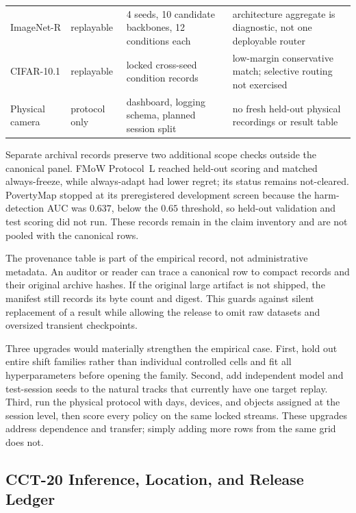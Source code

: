 \begin{table}[!t]
\begin{tabular}{@{}p{}p{}p{}p{}@{}}
ImageNet-R & replayable & 4 seeds, 10 candidate backbones, 12 conditions each & architecture aggregate is diagnostic, not one deployable router \\
CIFAR-10.1 & replayable & locked cross-seed condition records & low-margin conservative match; selective routing not exercised \\
Physical camera & protocol only & dashboard, logging schema, planned session split & no fresh held-out physical recordings or result table \\
\bottomrule
\end{tabular}
\end{table}

Separate archival records preserve two additional scope checks outside the canonical panel. FMoW
Protocol~L reached held-out scoring and matched always-freeze, while always-adapt had lower regret;
its status remains not-cleared. PovertyMap stopped at its preregistered development screen because
the harm-detection AUC was $0.637$, below the $0.65$ threshold, so held-out validation and test
scoring did not run. These records remain in the claim inventory and are not pooled with the
canonical rows.

The provenance table is part of the empirical record, not administrative metadata. An auditor or reader can trace a
canonical row to compact records and their original archive hashes. If the original large artifact
is not shipped, the manifest still records its byte count and digest. This guards against silent
replacement of a result while allowing the release to omit raw datasets and oversized transient
checkpoints.

Three upgrades would materially strengthen the empirical case. First, hold out entire shift
families rather than individual controlled cells and fit all hyperparameters before opening the
family. Second, add independent model and test-session seeds to the natural tracks that currently
have one target replay. Third, run the physical protocol with days, devices, and objects assigned at
the session level, then score every policy on the same locked streams. These upgrades address
dependence and transfer; simply adding more rows from the same grid does not.

\subsection{CCT-20 Inference, Location, and Release Ledger}
\label{app:cct20-ledger}

